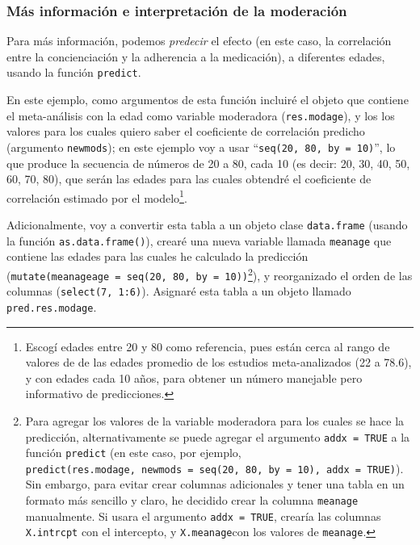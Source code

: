 \documentclass[
  bookmarksnumbered]{article}
\begin{document}
\hypertarget{pred-mods}{%
\subsubsection{Más información e interpretación de la moderación}\label{pred-mods}}

Para más información, podemos \emph{predecir} el efecto (en este caso, la correlación entre la concienciación y la adherencia a la medicación), a diferentes edades, usando la función \texttt{predict}.

En este ejemplo, como argumentos de esta función incluiré el objeto que contiene el meta-análisis con la edad como variable moderadora (\texttt{res.modage}), y los los valores para los cuales quiero saber el coeficiente de correlación predicho (argumento \texttt{newmods}); en este ejemplo voy a usar ``\texttt{seq(20,\ 80,\ by\ =\ 10)}'', lo que produce la secuencia de números de 20 a 80, cada 10 (es decir: 20, 30, 40, 50, 60, 70, 80), que serán las edades para las cuales obtendré el coeficiente de correlación estimado por el modelo\footnote{Escogí edades entre 20 y 80 como referencia, pues están cerca al rango de valores de de las edades promedio de los estudios meta-analizados (22 a 78.6), y con edades cada 10 años, para obtener un número manejable pero informativo de predicciones.}.

Adicionalmente, voy a convertir esta tabla a un objeto clase \texttt{data.frame} (usando la función \texttt{as.data.frame()}), crearé una nueva variable llamada \texttt{meanage} que contiene las edades para las cuales he calculado la predicción (\texttt{mutate(meanageage\ =\ seq(20,\ 80,\ by\ =\ 10))}\footnote{Para agregar los valores de la variable moderadora para los cuales se hace la predicción, alternativamente se puede agregar el argumento \texttt{addx\ =\ TRUE} a la función \texttt{predict} (en este caso, por ejemplo, \texttt{predict(res.modage,\ newmods\ =\ seq(20,\ 80,\ by\ =\ 10),\ addx\ =\ TRUE)}). Sin embargo, para evitar crear columnas adicionales y tener una tabla en un formato más sencillo y claro, he decidido crear la columna \texttt{meanage} manualmente. Si usara el argumento \texttt{addx\ =\ TRUE}, crearía las columnas \texttt{X.intrcpt} con el intercepto, y \texttt{X.meanage}con los valores de \texttt{meanage}.}), y reorganizado el orden de las columnas (\texttt{select(7,\ 1:6)}). Asignaré esta tabla a un objeto llamado \texttt{pred.res.modage}.
\end{document}
